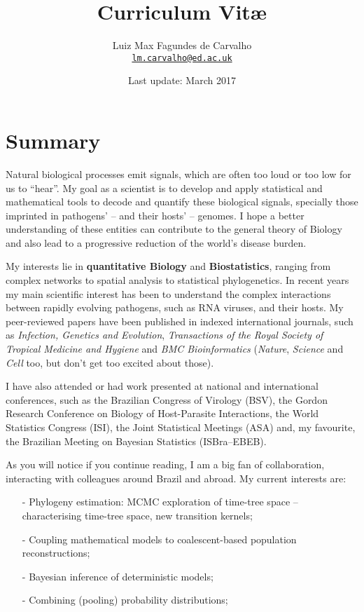 \documentclass[10pt]{article}
\title{\bfseries Curriculum Vit\ae}
\author{Luiz Max Fagundes de Carvalho \\
\href{mailto:lm.carvalho@ed.ac.uk}{\nolinkurl{lm.carvalho@ed.ac.uk}}}
\affil{Rambaut Group, Institute of Evolutionary Biology, School of Biological Sciences, University of Edinburgh, UK.}
\date{Last update: March 2017}
\begin{document}
\maketitle

\section*{Summary}

Natural biological processes emit signals, which are often too loud or too low for us to ``hear''.
My goal as a scientist is to develop and apply statistical and mathematical tools to decode and quantify these biological signals, specially those imprinted in pathogens' -- and their hosts' -- genomes.
I hope a better understanding of these entities can contribute to the general theory of Biology and also lead to a progressive reduction of the world's disease burden.

My interests lie in \textbf{quantitative Biology} and \textbf{Biostatistics}, ranging from complex networks to spatial analysis to statistical phylogenetics.
In recent years my main scientific interest has been to understand the complex interactions between rapidly evolving pathogens, such as {RNA} viruses, and their hosts.
My peer-reviewed papers have been published in indexed international journals, such as \textit{Infection, Genetics and Evolution}, \textit{Transactions of the Royal Society of Tropical Medicine and Hygiene} and \textit{BMC Bioinformatics} (\textit{Nature}, \textit{Science} and \textit{Cell} too, but don't get too excited about those).

I have also attended or had work presented at national and international conferences, such as the Brazilian Congress of Virology (BSV), the Gordon Research Conference on Biology of Host-Parasite Interactions, the World Statistics Congress (ISI), the Joint Statistical Meetings (ASA) and, my favourite, the Brazilian Meeting on Bayesian Statistics (ISBra--EBEB).

As you will notice if you continue reading, I am a big fan of collaboration, interacting with colleagues around Brazil and abroad.
My current interests are:
\begin{itemize}
\itemsep0.1em
 \item [-] Phylogeny estimation: MCMC exploration of time-tree space -- characterising time-tree space, new transition kernels;
 \item [-] Coupling mathematical models to coalescent-based population reconstructions;
 \item [-] Bayesian inference of deterministic models;
 \item [-] Combining (pooling) probability distributions;
\end{itemize}
\end{document}
